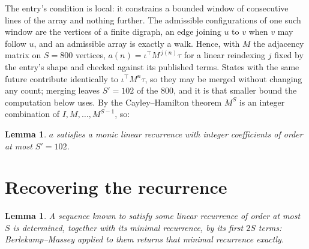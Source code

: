 \documentclass[11pt,a4paper]{article}
\theoremstyle{plain}
\newtheorem{lemma}[theorem]{Lemma}
\theoremstyle{definition}
\begin{document}
The entry's condition is local: it constrains a bounded window of consecutive lines of the
array and nothing further. The admissible configurations of one such window are the vertices
of a finite digraph, an edge joining $u$ to $v$ when $v$ may follow $u$, and an admissible
array is exactly a walk. Hence, with $M$ the adjacency matrix on $S=800$ vertices,
$a(n)=\iota^{\!\top}M^{\,j(n)}\tau$ for a linear reindexing $j$ fixed by the entry's shape
and checked against its published terms. States with the same future contribute identically to $\iota^{\!\top}M^n\tau$, so they may be merged without changing any count; merging leaves $S'=102$ of the $800$, and it is that smaller bound the computation below uses. By the Cayley--Hamilton theorem $M^{S}$ is an
integer combination of $I,M,\dots,M^{S-1}$, so:

\begin{lemma}\label{lem:cf}
$a$ satisfies a monic linear recurrence with integer coefficients of order at most
$S'=102$.
\end{lemma}

\section{Recovering the recurrence}

\begin{lemma}\label{lem:bm}
A sequence known to satisfy some linear recurrence of order at most $S$ is determined, together
with its minimal recurrence, by its first $2S$ terms: Berlekamp--Massey applied to them returns
that minimal recurrence exactly.
\end{lemma}
\end{document}
